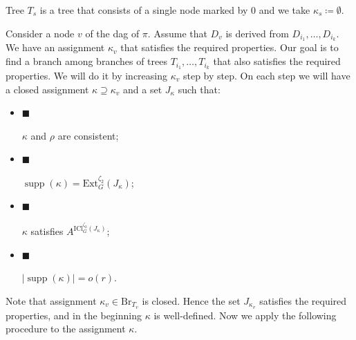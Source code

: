 \documentclass[10pt,a4paper]{article}
\begin{document}
Tree $T_{s}$ is a tree that consists of a single node marked by $0$ and we take $\kappa_{s}\coloneqq\emptyset$.\par




Consider a node $v$ of the dag of $\pi$. Assume that $D_{v}$ is derived from $D_{i_{1}},\dots,D_{i_{k}}$.
We have an assignment $\kappa_{v}$ that satisfies the required properties. Our goal is to find a branch
among branches of trees $T_{i_{1}},\dots,T_{i_{k}}$ that also satisfies the required properties. We will do
it by increasing $\kappa_{v}$ step by step. On each step we will have a closed assignment $\kappa\supseteq\kappa_{v}$ and a set $J_{\kappa}$ such that:\par




\begin{itemize}


\item[] 
$\blacksquare$ 


$\kappa$ and $\rho$ are consistent;\par





\item[] 
$\blacksquare$ 


$\operatorname*{supp}(\kappa)=\mathrm{Ext}_{G}^{\zeta_{2}}\left(J_{\kappa}\right)$;\par





\item[] 
$\blacksquare$ 


$\kappa$ satisfies $A^{\mathrm{ICl}_{G}^{\zeta_{2}}\left(J_{\kappa}\right)}$;\par





\item[] 
$\blacksquare$ 


$|\operatorname*{supp}(\kappa)|=o(r)$.\par





\end{itemize}




Note that assignment $\kappa_{v}\in\mathrm{Br}_{T_{v}}$ is closed. Hence the set $J_{\kappa_{v}}$ satisfies the required
properties, and in the beginning $\kappa$ is well-defined. Now we apply the following procedure to the
assignment $\kappa$.\par
\end{document}
